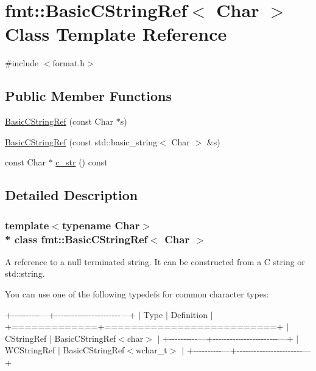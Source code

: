 \hypertarget{classfmt_1_1BasicCStringRef}{}\section{fmt\+:\+:Basic\+C\+String\+Ref$<$ Char $>$ Class Template Reference}
\label{classfmt_1_1BasicCStringRef}


{\ttfamily \#include $<$format.\+h$>$}

\subsection*{Public Member Functions}
\begin{DoxyCompactItemize}
\item 
\hyperlink{classfmt_1_1BasicCStringRef_ad79244507bdc1213e0dc6c505cf265f2}{Basic\+C\+String\+Ref} (const Char $\ast$s)
\item 
\hyperlink{classfmt_1_1BasicCStringRef_ab460855d19c769773de532296f9f13f9}{Basic\+C\+String\+Ref} (const std\+::basic\+\_\+string$<$ Char $>$ \&s)
\item 
const Char $\ast$ \hyperlink{classfmt_1_1BasicCStringRef_ae3bafa845b53339b20c4f5edb4f635f9}{c\+\_\+str} () const 
\end{DoxyCompactItemize}


\subsection{Detailed Description}
\subsubsection*{template$<$typename Char$>$\\*
class fmt\+::\+Basic\+C\+String\+Ref$<$ Char $>$}

A reference to a null terminated string. It can be constructed from a C string or {\ttfamily std\+::string}.

You can use one of the following typedefs for common character types\+:

+-\/-\/-\/-\/-\/-\/-\/-\/-\/-\/---+-\/-\/-\/-\/-\/-\/-\/-\/-\/-\/-\/-\/-\/-\/-\/-\/-\/-\/-\/-\/-\/-\/-\/---+ $\vert$ Type $\vert$ Definition $\vert$ +=============+==========================+ $\vert$ C\+String\+Ref $\vert$ Basic\+C\+String\+Ref$<$char$>$ $\vert$ +-\/-\/-\/-\/-\/-\/-\/-\/-\/-\/---+-\/-\/-\/-\/-\/-\/-\/-\/-\/-\/-\/-\/-\/-\/-\/-\/-\/-\/-\/-\/-\/-\/-\/---+ $\vert$ W\+C\+String\+Ref $\vert$ Basic\+C\+String\+Ref$<$wchar\+\_\+t$>$ $\vert$ +-\/-\/-\/-\/-\/-\/-\/-\/-\/-\/---+-\/-\/-\/-\/-\/-\/-\/-\/-\/-\/-\/-\/-\/-\/-\/-\/-\/-\/-\/-\/-\/-\/-\/---+

